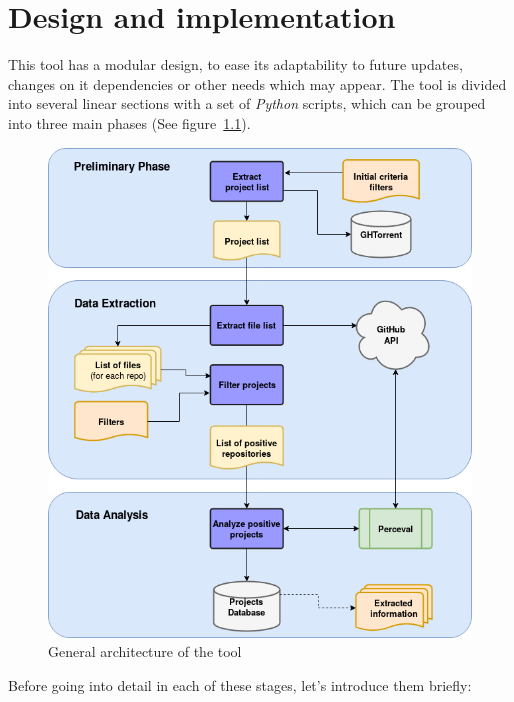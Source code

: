 \documentclass[a4paper, 12pt]{book}
\begin{document}
\chapter{Design and implementation}
\label{sec:design-implementation}
This tool has a modular design, to ease its adaptability to future updates, changes on it dependencies or other needs which may appear.
The tool is divided into several linear sections with a set of \emph{Python} scripts, which can be grouped into three
main phases (See figure~\ref{fig:arquitectura}).
\begin{figure}
  \centering
  \includegraphics[width=12cm, keepaspectratio]{img/generic-tool-diagram-sections}
  \caption{General architecture of the tool}
  \label{fig:arquitectura}
\end{figure}
Before going into detail in each of these stages, let's introduce them briefly:
\end{document}

